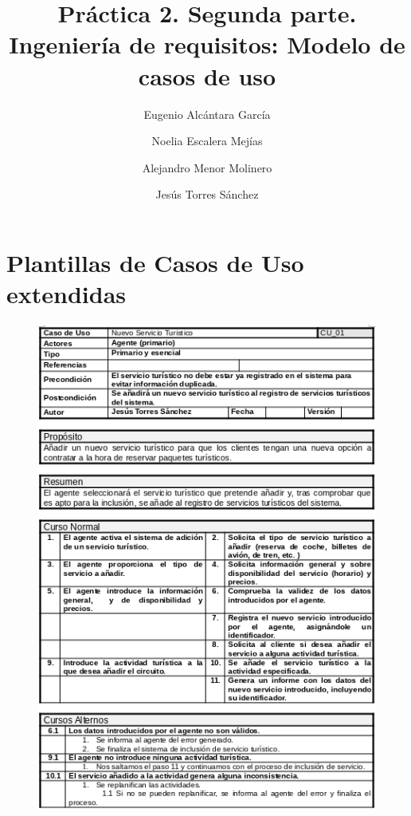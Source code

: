 \documentclass{article}
\title{Práctica 2. Segunda parte. Ingeniería de requisitos: Modelo de casos de uso}
\author{Eugenio Alcántara García\\
		\and Noelia Escalera Mejías\\
		\and Alejandro Menor Molinero\\
		\and Jesús Torres Sánchez}
\begin{document}
	\maketitle
	\section{Plantillas de Casos de Uso extendidas}
	\begin{figure}[H]
		\centering
		\includegraphics[totalheight=12cm]{cu-1}
	\end{figure}
	
	
	
	
	
	
	
\end{document}
